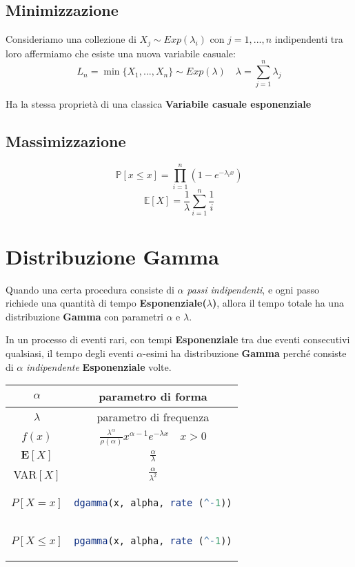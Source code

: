 \subsection{Minimizzazione}
Consideriamo una collezione di \(X_j \sim Exp(\lambda_i)\) con \(j = 1,...,n\) indipendenti tra loro affermiamo che esiste una nuova variabile casuale:
\[L_n = \min\{X_1,...,X_n\} \sim Exp(\lambda) \quad \lambda = \sum_{j = 1}^n \lambda_j\]
\centerline{Ha la stessa proprietà di una classica \textbf{Variabile casuale esponenziale}}

\subsection{Massimizzazione}
\[\mathbb{P}[x \leq x] = \prod_{i = 1}^n (1-e^{-\lambda_ix})\]
\[\mathbb{E}[X] = \frac{1}{\lambda} \sum_{i=1}^n \frac{1}{i}\]

\section{Distribuzione Gamma}
\begin{tcolorbox}
Quando una certa procedura consiste di \(\alpha\) \textit{passi indipendenti}, e ogni passo richiede una quantità di tempo \textbf{Esponenziale(\(\lambda\))}, allora il tempo totale ha una distribuzione \textbf{Gamma } con parametri \(\alpha\) e \(\lambda\).

In un processo di eventi rari, con tempi \textbf{Esponenziale} tra due eventi consecutivi qualsiasi, il tempo degli eventi \(\alpha\)-esimi ha distribuzione \textbf{Gamma} perché consiste di \(\alpha\) \textit{indipendente} \textbf{Esponenziale} volte.
\end{tcolorbox}

\begingroup
\setlength{\tabcolsep}{10pt} %
\renewcommand{\arraystretch}{1.5} %
\begin{center}
\begin{tabular}{ |c|c| } 
\hline
\(\alpha\) & parametro di forma \\ \hline
\(\lambda\) & parametro di frequenza \\ \hline
\(f(x)\) & $\frac{\lambda^\alpha}{\rho(\alpha)}x^{\alpha - 1}e^{-\lambda x} \quad x > 0$ \\ \hline
\(\mathbf{E}[X]\) & \(\frac{\alpha}{\lambda}\) \\ \hline
VAR\([X]\) & \(\frac{\alpha}{\lambda^2}\) \\ \hline\hline
\(P[X = x]\) & \begin{lstlisting}[language=R]
dgamma(x, alpha, rate (^-1))
\end{lstlisting} \\ \hline
\(P[X \leq x]\) & \begin{lstlisting}[language=R]
pgamma(x, alpha, rate (^-1))
\end{lstlisting} \\ \hline
\end{tabular}
\end{center}
\endgroup

